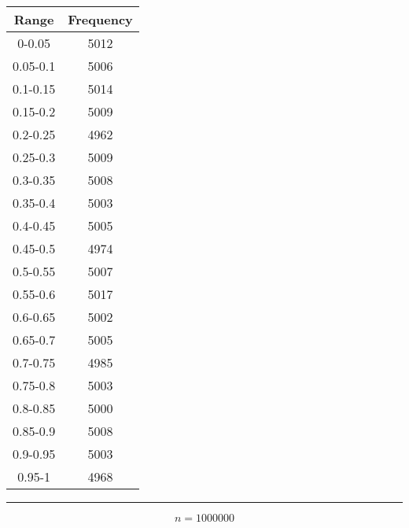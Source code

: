 \documentclass{article}
\begin{document}
\begin{center} \begin{tabular}{||c | c||}  \hline
		Range & Frequency \\ [0.5ex] \hline \hline0-0.05 & 5012\\
		\hline 
		0.05-0.1 & 5006\\
		\hline 
		0.1-0.15 & 5014\\
		\hline 
		0.15-0.2 & 5009\\
		\hline 
		0.2-0.25 & 4962\\
		\hline 
		0.25-0.3 & 5009\\
		\hline 
		0.3-0.35 & 5008\\
		\hline 
		0.35-0.4 & 5003\\
		\hline 
		0.4-0.45 & 5005\\
		\hline 
		0.45-0.5 & 4974\\
		\hline 
		0.5-0.55 & 5007\\
		\hline 
		0.55-0.6 & 5017\\
		\hline 
		0.6-0.65 & 5002\\
		\hline 
		0.65-0.7 & 5005\\
		\hline 
		0.7-0.75 & 4985\\
		\hline 
		0.75-0.8 & 5003\\
		\hline 
		0.8-0.85 & 5000\\
		\hline 
		0.85-0.9 & 5008\\
		\hline 
		0.9-0.95 & 5003\\
		\hline 
		0.95-1 & 4968\\
		\hline 
	\end{tabular} 
\end{center}

\pagebreak

\begin {figure}
\begin{center}
	
\end{center}
\end {figure}
\noindent\rule[0.5ex]{\linewidth}{1pt}


$$n= 1000000$$
\end{document}
